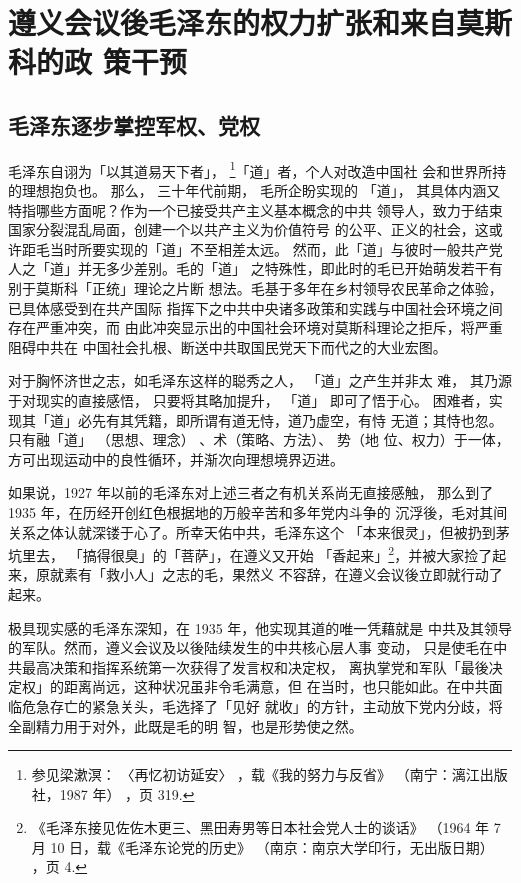 \chapter{遵义会议後毛泽东的权力扩张和来自莫斯科的政
策干预}

\section{毛泽东逐步掌控军权、党权}
毛泽东自诩为「以其道易天下者」， \footnote{参见梁漱溟：
〈再忆初访延安〉 ，载《我的努力与反省》
（南宁：漓江出版社，1987 年） ，页 319.}「道」者，个人对改造中国社
会和世界所持的理想抱负也。
那么，
三十年代前期，
毛所企盼实现的
「道」，
其具体内涵又特指哪些方面呢？作为一个已接受共产主义基本概念的中共
领导人，致力于结束国家分裂混乱局面，创建一个以共产主义为价值符号
的公平、正义的社会，这或许距毛当时所要实现的「道」不至相差太远。
然而，此「道」与彼时一般共产党人之「道」并无多少差别。毛的「道」
之特殊性，即此时的毛已开始萌发若干有别于莫斯科「正统」理论之片断
想法。毛基于多年在乡村领导农民革命之体验，已具体感受到在共产国际
指挥下之中共中央诸多政策和实践与中国社会环境之间存在严重冲突，而
由此冲突显示出的中国社会环境对莫斯科理论之拒斥，将严重阻碍中共在
中国社会扎根、断送中共取国民党天下而代之的大业宏图。

对于胸怀济世之志，如毛泽东这样的聪秀之人，
「道」之产生并非太
难， 其乃源于对现实的直接感悟，
只要将其略加提升， 「道」
即可了悟于心。
困难者，实现其「道」必先有其凭籍，即所谓有道无恃，道乃虚空，有恃
无道；其恃也忽。只有融「道」 （思想、理念） 、术（策略、方法）、
势（地 位、权力）于一体，方可出现运动中的良性循环，并渐次向理想境界迈进。

如果说，1927 年以前的毛泽东对上述三者之有机关系尚无直接感触，
那么到了 1935 年，在历经开创红色根据地的万般辛苦和多年党内斗争的
沉浮後，毛对其间关系之体认就深镂于心了。所幸天佑中共，毛泽东这个
「本来很灵」，但被扔到茅坑里去，
「搞得很臭」的「菩萨」，在遵义又开始
「香起来」\footnote{《毛泽东接见佐佐木更三、黑田寿男等日本社会党人士的谈话》
（1964 年 7 月 10 日，载《毛泽东论党的历史》
（南京：南京大学印行，无出版日期） ，页 4.}，并被大家捡了起来，原就素有「救小人」之志的毛，果然义
不容辞，在遵义会议後立即就行动了起来。
 
极具现实感的毛泽东深知，在 1935 年，他实现其道的唯一凭藉就是
中共及其领导的军队。然而，遵义会议及以後陆续发生的中共核心层人事
变动，
只是使毛在中共最高决策和指挥系统第一次获得了发言权和决定权，
离执掌党和军队「最後决定权」的距离尚远，这种状况虽非令毛满意，但
在当时，也只能如此。在中共面临危急存亡的紧急关头，毛选择了「见好
就收」的方针，主动放下党内分歧，将全副精力用于对外，此既是毛的明
智，也是形势使之然。

